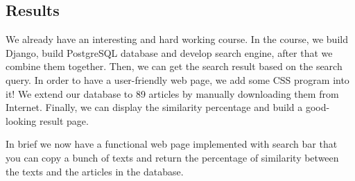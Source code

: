 
\subsection{Results}
We already have an interesting and hard working course. In the  course, we build Django, build PostgreSQL database and develop search engine, after that we combine them together. Then, we can get the search result based on the search query. In order to have a user-friendly web page, we add some CSS program into it! We extend our database to 89 articles by manually downloading them from Internet. Finally, we can display the similarity percentage and build a good-looking result page.

In brief we now have a functional web page implemented with search bar that you can copy a bunch of texts and return the percentage of similarity between the texts and the articles in the database.
